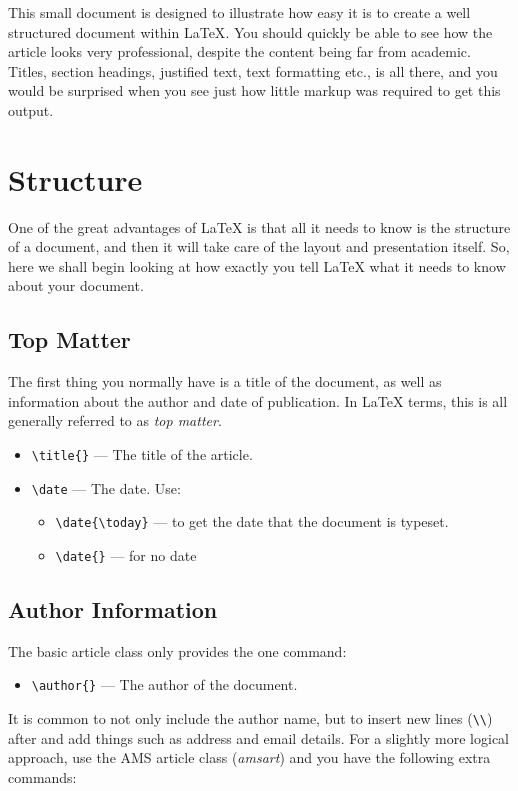 \documentclass{article}
\begin{document}
This small document is designed to illustrate how easy it is to create a well structured
document within \LaTeX\cite{lamport94}.  You should quickly be able to see how the article
looks very professional, despite the content being far from academic.  Titles, section
headings, justified text, text formatting etc., is all there, and you would be surprised
when you see just how little markup was required to get this output.

\section{Structure}
\label{sec:structure}

One of the great advantages of \LaTeX{} is that all it needs to know is
the structure of a document, and then it will take care of the layout
and presentation itself.  So, here we shall begin looking at how exactly
you tell \LaTeX{} what it needs to know about your document.

\subsection{Top Matter}
\label{sec:top-matter}

The first thing you normally have is a title of the document, as well as
information about the author and date of publication.  In \LaTeX{} terms,
this is all generally referred to as \emph{top matter}.
\begin{itemize}
\item \verb|\title{}| --- The title of the article.
\item \verb|\date| --- The date. Use:
  \begin{itemize}
  \item \verb|\date{\today}| --- to get the date that the document is typeset.
  \item \verb|\date{}| --- for no date
  \end{itemize}
\end{itemize}
\subsection{Author Information}
\label{sec:author-information}

The basic article class only provides the one command:
\begin{itemize}
\item \verb|\author{}| --- The author of the document.
\end{itemize}
It is common to not only include the author name, but to insert new lines (\verb|\\|)
after and add things such as address and email details.  For a slightly more logical
approach, use the AMS article class (\emph{amsart}) and you have the following extra
commands:
\end{document}
